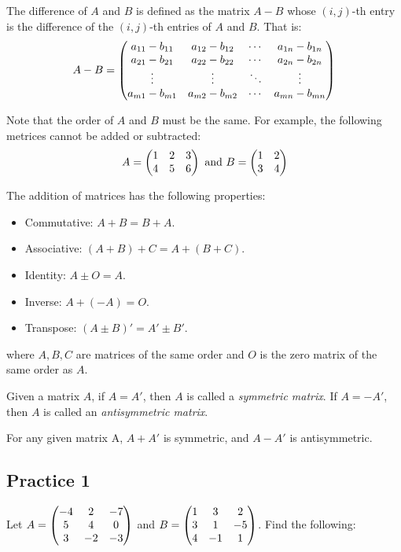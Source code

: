 \documentclass{report}
\begin{document}
\begin{multicols}{2}
  The difference of $A$ and $B$ is defined as the matrix $A - B$ whose $(i,
    j)$-th entry is the difference of the $(i, j)$-th entries of $A$ and $B$. That
  is: \[A - B = \begin{pmatrix}
      a_{11} - b_{11} & a_{12} - b_{12} & \cdots & a_{1n} - b_{1n} \\
      a_{21} - b_{21} & a_{22} - b_{22} & \cdots & a_{2n} - b_{2n} \\
      \vdots          & \vdots          & \ddots & \vdots          \\
      a_{m1} - b_{m1} & a_{m2} - b_{m2} & \cdots & a_{mn} - b_{mn}
    \end{pmatrix}\]

  Note that the order of $A$ and $B$ must be the same. For example, the following
  metrices cannot be added or subtracted:
  \[
    A = \begin{pmatrix}
      1 & 2 & 3 \\
      4 & 5 & 6
    \end{pmatrix}
    \text{\ and\ }
    B = \begin{pmatrix}
      1 & 2 \\
      3 & 4
    \end{pmatrix}
  \]

  \noindent The addition of matrices has the following properties: \begin{itemize}
    \item Commutative: $A + B = B + A$.
    \item Associative: $(A + B) + C = A + (B + C)$.
    \item Identity: $A \pm O = A$.
    \item Inverse: $A + (-A) = O$.
    \item Transpose: $(A \pm B)' = A' \pm B'$.
  \end{itemize}
  where $A, B, C$ are matrices of the same order and $O$ is the zero matrix of the
  same order as $A$.

  Given a matrix $A$, if $A = A'$, then $A$ is called a \emph{symmetric matrix}.
  If $A = -A'$, then $A$ is called an \emph{antisymmetric matrix}.

  For any given matrix A, $A + A'$ is symmetric, and $A - A'$ is antisymmetric.

  \singlespacing{}

  \subsection{Practice 1}

  Let $A = \begin{pmatrix} -4 & 2 & -7 \\ 5 & 4 & 0 \\ 3 & -2 & -3 \end{pmatrix}$ and $B = \begin{pmatrix} 1 & 3 & 2
      \\ 3 & 1 & -5 \\ 4 & -1 & 1 \end{pmatrix}$. Find the following:


\end{multicols}
\end{document}
